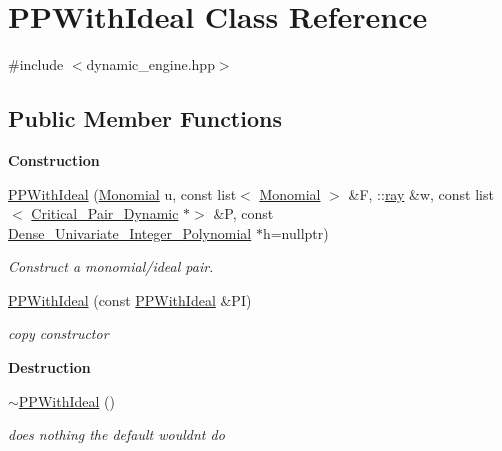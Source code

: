 \hypertarget{class_p_p_with_ideal}{}\section{P\+P\+With\+Ideal Class Reference}
\label{class_p_p_with_ideal}


{\ttfamily \#include $<$dynamic\+\_\+engine.\+hpp$>$}

\subsection*{Public Member Functions}
\begin{Indent}\textbf{ Construction}\par
\begin{DoxyCompactItemize}
\item 
\hyperlink{class_p_p_with_ideal_a4aaab17f2c6c03dfe1b6cc6bb2ca3f73}{P\+P\+With\+Ideal} (\hyperlink{class_monomial}{Monomial} u, const list$<$ \hyperlink{class_monomial}{Monomial} $>$ \&F, \+::\hyperlink{classray}{ray} \&w, const list$<$ \hyperlink{class_critical___pair___dynamic}{Critical\+\_\+\+Pair\+\_\+\+Dynamic} $\ast$$>$ \&P, const \hyperlink{class_dense___univariate___integer___polynomial}{Dense\+\_\+\+Univariate\+\_\+\+Integer\+\_\+\+Polynomial} $\ast$h=nullptr)
\begin{DoxyCompactList}\small\item\em Construct a monomial/ideal pair. \end{DoxyCompactList}\item 
\mbox{\label{class_p_p_with_ideal_aee52e551312d3380a5a25ed2e02c8d87}} 
\hyperlink{class_p_p_with_ideal_aee52e551312d3380a5a25ed2e02c8d87}{P\+P\+With\+Ideal} (const \hyperlink{class_p_p_with_ideal}{P\+P\+With\+Ideal} \&PI)
\begin{DoxyCompactList}\small\item\em copy constructor \end{DoxyCompactList}\end{DoxyCompactItemize}
\end{Indent}
\begin{Indent}\textbf{ Destruction}\par
\begin{DoxyCompactItemize}
\item 
\mbox{\label{class_p_p_with_ideal_acea0ed75b266fc9abcf1fd0833493230}} 
\hyperlink{class_p_p_with_ideal_acea0ed75b266fc9abcf1fd0833493230}{$\sim$\+P\+P\+With\+Ideal} ()
\begin{DoxyCompactList}\small\item\em does nothing the default wouldn\textquotesingle{}t do \end{DoxyCompactList}\end{DoxyCompactItemize}
\end{Indent}
